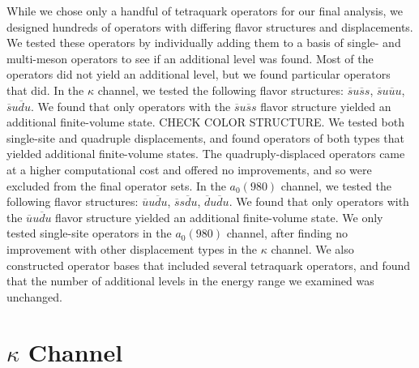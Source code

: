While we chose only a handful of tetraquark operators for our final analysis, we designed hundreds of operators with differing flavor structures and displacements. We tested these operators by individually adding them to a basis of single- and multi-meson operators to see if an additional level was found. Most of the operators did not yield an additional level, but we found particular operators that did. In the $\kappa$ channel, we tested the following flavor structures: $\overline s u \overline s s$, $\overline s u \overline u u$, $\overline s u \overline d u$. We found that only operators with the $\overline s u \overline s s$ flavor structure yielded an additional finite-volume state. CHECK COLOR STRUCTURE. We tested both single-site and quadruple displacements, and found operators of both types that yielded additional finite-volume states. The quadruply-displaced operators came at a higher computational cost and offered no improvements, and so were excluded from the final operator sets. In the $a_0(980)$ channel, we tested the following flavor structures: $\overline u u \overline d u$, $\overline s s \overline d u$, $\overline d u \overline d u$. We found that only operators with the $\overline u u \overline d u$ flavor structure yielded an additional finite-volume state. We only tested single-site operators in the $a_0(980)$ channel, after finding no improvement with other displacement types in the $\kappa$ channel. We also constructed operator bases that included several tetraquark operators, and found that the number of additional levels in the energy range we examined was unchanged.

\section{$\kappa$ Channel}
